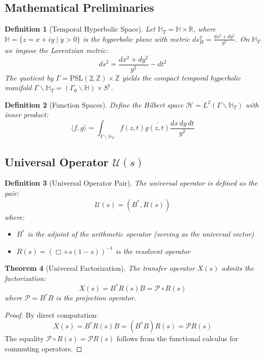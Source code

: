 \documentclass[11pt]{article}
\theoremstyle{plain}
\newtheorem{theorem}{Theorem}[section]
\newtheorem{definition}[theorem]{Definition}
\theoremstyle{remark}
\newcommand{\R}{\mathbb{R}}
\newcommand{\Z}{\mathbb{Z}}
\newcommand{\H}{\mathbb{H}}
\newcommand{\PSL}{\text{PSL}}
\newcommand{\cH}{\mathcal{H}}
\newcommand{\cU}{\mathcal{U}}
\newcommand{\cP}{\mathcal{P}}
\newcommand{\BoxOp}{\Box}
\begin{document}
\subsection{Mathematical Preliminaries}

\begin{definition}[Temporal Hyperbolic Space]
Let $\H_T = \H \times \R$, where $\H = \{z = x + iy \mid y > 0\}$ is the hyperbolic plane with metric $ds^2_H = \frac{dx^2 + dy^2}{y^2}$. On $\H_T$ we impose the Lorentzian metric:
\[
ds^2 = \frac{dx^2 + dy^2}{y^2} - dt^2
\]
The quotient by $\Gamma = \PSL(2,\Z) \times \Z$ yields the compact temporal hyperbolic manifold $\Gamma \backslash \H_T = (\Gamma_0 \backslash \H) \times S^1$.
\end{definition}

\begin{definition}[Function Spaces]
Define the Hilbert space $\cH = L^2(\Gamma \backslash \H_T)$ with inner product:
\[
\langle f, g \rangle = \int_{\Gamma \backslash \H_T} f(z,t) \overline{g(z,t)} \frac{dx\,dy\,dt}{y^2}
\]
\end{definition}

\subsection{Universal Operator $\cU(s)$}

\begin{definition}[Universal Operator Pair]
The universal operator is defined as the pair:
\[
\cU(s) = (B^*, R(s))
\]
where:
\begin{itemize}
\item $B^*$ is the adjoint of the arithmetic operator (serving as the universal vector)
\item $R(s) = (\BoxOp + s(1-s))^{-1}$ is the resolvent operator
\end{itemize}
\end{definition}

\begin{theorem}[Universal Factorization]
The transfer operator $X(s)$ admits the factorization:
\[
X(s) = B^* R(s) B = \cP \circ R(s)
\]
where $\cP = B^*B$ is the projection operator.
\end{theorem}

\begin{proof}
By direct computation:
\[
X(s) = B^* R(s) B = (B^*B) R(s) = \cP R(s)
\]
The equality $\cP \circ R(s) = \cP R(s)$ follows from the functional calculus for commuting operators.
\end{proof}
\end{document}
